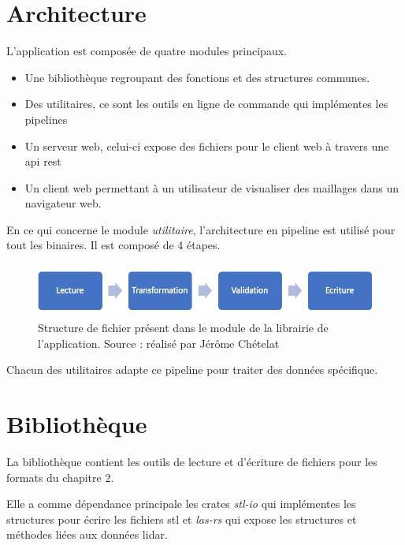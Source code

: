\section{Architecture}

L'application est composée de quatre modules principaux.

\begin{itemize}
	\item Une bibliothèque regroupant des fonctions et des structures communes.
	\item Des utilitaires, ce sont les outils en ligne de commande qui
		implémentes les pipelines 
	\item Un serveur web, celui-ci expose des fichiers pour le client web à
		travers une api \gls{rest}
	\item Un client web permettant à un utilisateur de visualiser des maillages
		dans un navigateur web.
\end{itemize}

En ce qui concerne le module \textit{utilitaire}, l'architecture en pipeline est
utilisé pour tout les binaires. Il est composé de 4 étapes. 

\begin{figure}[htbp!]
    \centering
    \includegraphics[width=0.7\linewidth]{figures/pipeline_process.png}
    \caption{Structure de fichier présent dans le module de la librairie de l'application. Source : réalisé par Jérôme Chételat}
    \label{fig:pipeline_process}
\end{figure}

Chacun des utilitaires adapte ce pipeline pour traiter des données spécifique.

\section{Bibliothèque}

La bibliothèque contient les outils de lecture et d'écriture de fichiers pour les formats du chapitre 2.

Elle a comme dépendance principale les crates \textit{stl-io}
qui implémentes les structures pour écrire les fichiers \gls{stl} 
et \textit{las-rs} qui expose les structures et méthodes liées aux données lidar.

